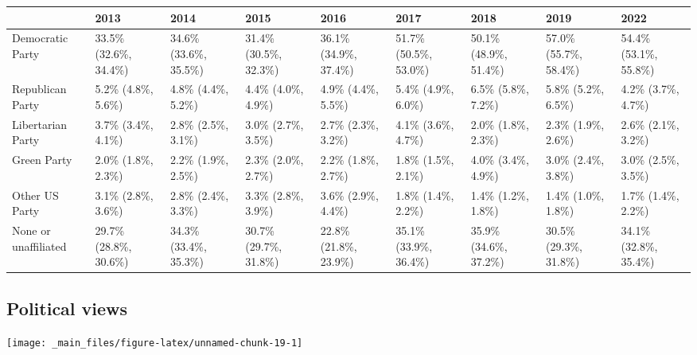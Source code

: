 \documentclass[
]{book}
\begin{document}
\begin{table}
\centering
\begin{tabular}[t]{>{}l|>{}l|>{}l|>{}l|>{}l|>{}l|>{}l|>{}l|>{}l}
\hline
  & 2013 & 2014 & 2015 & 2016 & 2017 & 2018 & 2019 & 2022\\
\hline
Democratic Party & 33.5\% (32.6\%, 34.4\%) & 34.6\% (33.6\%, 35.5\%) & 31.4\% (30.5\%, 32.3\%) & 36.1\% (34.9\%, 37.4\%) & 51.7\% (50.5\%, 53.0\%) & 50.1\% (48.9\%, 51.4\%) & 57.0\% (55.7\%, 58.4\%) & 54.4\% (53.1\%, 55.8\%)\\
\hline
Republican Party & 5.2\% (4.8\%, 5.6\%) & 4.8\% (4.4\%, 5.2\%) & 4.4\% (4.0\%, 4.9\%) & 4.9\% (4.4\%, 5.5\%) & 5.4\% (4.9\%, 6.0\%) & 6.5\% (5.8\%, 7.2\%) & 5.8\% (5.2\%, 6.5\%) & 4.2\% (3.7\%, 4.7\%)\\
\hline
Libertarian Party & 3.7\% (3.4\%, 4.1\%) & 2.8\% (2.5\%, 3.1\%) & 3.0\% (2.7\%, 3.5\%) & 2.7\% (2.3\%, 3.2\%) & 4.1\% (3.6\%, 4.7\%) & 2.0\% (1.8\%, 2.3\%) & 2.3\% (1.9\%, 2.6\%) & 2.6\% (2.1\%, 3.2\%)\\
\hline
Green Party & 2.0\% (1.8\%, 2.3\%) & 2.2\% (1.9\%, 2.5\%) & 2.3\% (2.0\%, 2.7\%) & 2.2\% (1.8\%, 2.7\%) & 1.8\% (1.5\%, 2.1\%) & 4.0\% (3.4\%, 4.9\%) & 3.0\% (2.4\%, 3.8\%) & 3.0\% (2.5\%, 3.5\%)\\
\hline
Other US Party & 3.1\% (2.8\%, 3.6\%) & 2.8\% (2.4\%, 3.3\%) & 3.3\% (2.8\%, 3.9\%) & 3.6\% (2.9\%, 4.4\%) & 1.8\% (1.4\%, 2.2\%) & 1.4\% (1.2\%, 1.8\%) & 1.4\% (1.0\%, 1.8\%) & 1.7\% (1.4\%, 2.2\%)\\
\hline
None or unaffiliated & 29.7\% (28.8\%, 30.6\%) & 34.3\% (33.4\%, 35.3\%) & 30.7\% (29.7\%, 31.8\%) & 22.8\% (21.8\%, 23.9\%) & 35.1\% (33.9\%, 36.4\%) & 35.9\% (34.6\%, 37.2\%) & 30.5\% (29.3\%, 31.8\%) & 34.1\% (32.8\%, 35.4\%)\\
\hline
\end{tabular}
\end{table}

\hypertarget{political-views}{%
\subsection{Political views}\label{political-views}}

\texttt{[image: \_main\_files/figure-latex/unnamed-chunk-19-1]}
\end{document}
